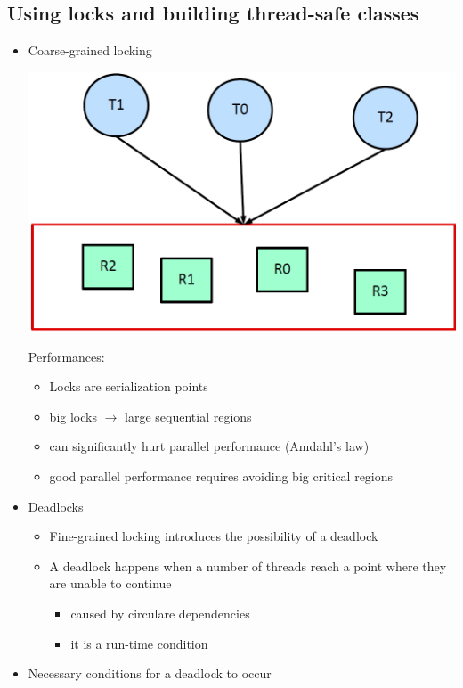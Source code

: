 \documentclass[a4paper]{article}
\begin{document}
\subsection*{Using locks and building thread-safe classes}
	\begin{itemize}
		\item Coarse-grained locking
		\begin{center}
				\includegraphics[scale=1]{Figures/CoarseGrainedLocking.jpg}
		\end{center}
		Performances:
			\begin{itemize}
				\item Locks are serialization points
				\item big locks $\to$ large sequential regions
				\item can significantly hurt parallel performance (Amdahl's law)
				\item good parallel performance requires avoiding big critical regions
			\end{itemize}
		\item Deadlocks
			\begin{itemize}
				\item Fine-grained locking introduces the possibility of a deadlock
				\item A deadlock happens when a number of threads reach a point where they are unable to continue
					\begin{itemize}
						\item caused by circulare dependencies
						\item it is a run-time condition
					\end{itemize}
			\end{itemize}
		\item Necessary conditions for a deadlock to occur

\end{itemize}
\end{document}

